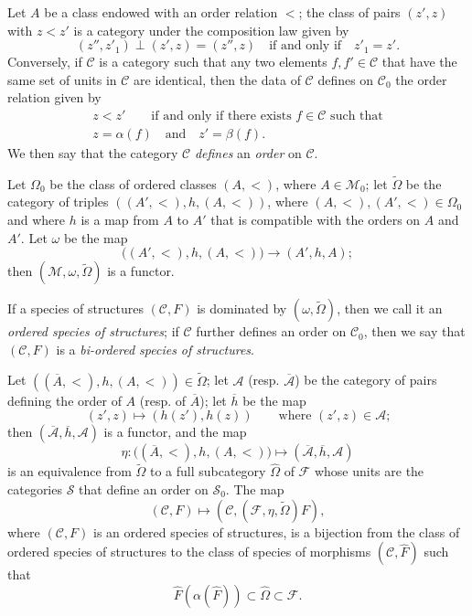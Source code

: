 \documentclass[a4paper,fleqn]{article}
\theoremstyle{plain}
\theoremstyle{definition}
\newenvironment{definition}[1]
  {\renewcommand\theinnerdefinition{#1}\innerdefinition}
  {\endinnerdefinition}
\newcommand{\oldpage}[1]{{\marginpar{\footnotesize$\bigg\vert$\,\,\,\,\textit{p.~#1}}}}
\newcommand{\textand}{\quad\text{and}\quad}
\newcommand{\CC}{\mathcal{C}}
\renewcommand{\SS}{\mathcal{S}}
\newcommand{\MM}{\mathcal{M}}
\newcommand{\FF}{\mathcal{F}}
\renewcommand{\AA}{\mathcal{A}}
\begin{document}
Let $A$ be a class endowed with an order relation $<$;
the class of pairs $(z',z)$ with $z<z'$ is a category under the composition law given by
\[
  (z'',z'_1)\perp(z',z)
  =(z'',z)
  \quad\text{if and only if}\quad
  z'_1=z'.
\]
\oldpage{356}
Conversely, if $\CC$ is a category such that any two elements $f,f'\in\CC$ that have the same set of units in $\CC$ are identical, then the data of $\CC$ defines on $\CC_0$ the order relation given by
\[
  \begin{gathered}
    z<z'
    \qquad\text{if and only if there exists $f\in\CC$ such that}
  \\z=\alpha(f)
    \textand
    z'=\beta(f).
  \end{gathered}
\]
We then say that the category $\CC$ \emph{defines} an \emph{order} on $\CC$.

Let $\Omega_0$ be the class of ordered classes $(A,<)$, where $A\in\MM_0$;
let $\widetilde{\Omega}$ be the category of triples $((A',<),h,(A,<))$, where $(A,<),(A',<)\in\Omega_0$ and where $h$ is a map from $A$ to $A'$ that is compatible with the orders on $A$ and $A'$.
Let $\omega$ be the map
\[
  \big((A',<),h,(A,<)\big)
  \longrightarrow (A',h,A);
\]
then $(\MM,\omega,\widetilde{\Omega})$ is a functor.

\begin{definition}{5}
\label{definition:i-5}
  If a species of structures $(\CC,F)$ is dominated by $(\omega,\widetilde{\Omega})$, then we call it an \emph{ordered species of structures};
  if $\CC$ further defines an order on $\CC_0$, then we say that $(\CC,F)$ is a \emph{bi-ordered species of structures}.
\end{definition}

Let $((\overline{A},<),h,(A,<))\in\widetilde{\Omega}$;
let $\AA$ (resp. $\overline{\AA}$) be the category of pairs defining the order of $A$ (resp. of $\overline{A}$);
let $\overline{h}$ be the map
\[
  (z',z)
  \longmapsto(h(z'),h(z))
  \qquad\text{where $(z',z)\in\AA$;}
\]
then $(\overline{\AA},\overline{h},\AA)$ is a functor, and the map
\[
  \eta\colon\big((\overline{A},<),h,(A,<)\big)
  \longmapsto(\overline{\AA},\overline{h},\AA)
\]
is an equivalence from $\widetilde{\Omega}$ to a full subcategory $\widehat{\Omega}$ of $\FF$ whose units are the categories $\SS$ that define an order on $\SS_0$.
The map
\[
  (\CC,F)
  \longmapsto (\CC,(\FF,\eta,\widetilde{\Omega})F),
\]
where $(\CC,F)$ is an ordered species of structures, is a bijection from the class of ordered species of structures to the class of species of morphisms $(\CC,\widehat{F})$ such that
\[
  \widehat{F}(\alpha(\widehat{F}))
  \subset \widehat{\Omega}
  \subset \FF.
\]
\end{document}
